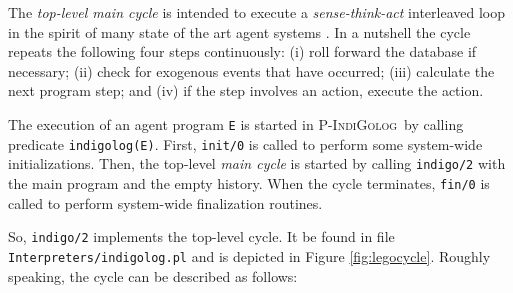 \documentclass[11pt]{article}
\newcommand{\PIndiGolog}{\mbox{\textsc{P-IndiGolog}}}
\begin{document}
The \textit{top-level main cycle} is intended to execute a
\textit{sense-think-act} interleaved loop in the spirit of many state of the art
agent systems \cite{Kowalski95}. In a nutshell the cycle repeats the following
four steps continuously: (i) roll forward the database if necessary; (ii)
check for exogenous events that have occurred; (iii) calculate the next program
step; and (iv) if the step involves an action, execute the action.

The execution of an agent program \texttt{E} is started in \PIndiGolog\ by
calling predicate \texttt{indigolog(E)}. First, \texttt{init/0} is called to
perform some system-wide initializations. Then, the top-level \textit{main
cycle} is started by calling \texttt{indigo/2} with the main program and the
empty history. When the cycle terminates, \texttt{fin/0} is called to perform
system-wide finalization routines.

So, \texttt{indigo/2} implements the top-level cycle. It be found in file
\texttt{Interpreters/indigolog.pl} and is depicted in Figure
\ref{fig:legocycle}. Roughly speaking, the cycle can be described
as follows:

\renewcommand{\labelenumii}{\arabic{enumi}.\arabic{enumii}.}
\renewcommand{\labelenumiii}{\arabic{enumi}.\arabic{enumii}.\arabic{enumiii}.}
\end{document}
